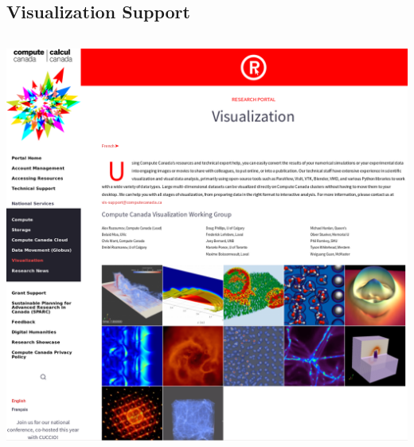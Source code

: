 \subsection{Visualization Support}
\begin{frame}
\begin{columns}
\begin{column}{13cm}
	\centering
	\href{https://www.computecanada.ca/research-portal/national-services/visualization/}{\includegraphics[width=\columnwidth]{figs/plots/others/CC-viz_website}}
\end{column}
\end{columns}
\end{frame}


